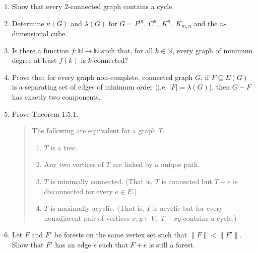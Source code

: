 \documentclass[12pt]{article}
\begin{document}
\begin{enumerate}
\item Show that every 2-connected graph contains a cycle.
\item Determine $\kappa(G)$ and $\lambda(G)$ for $G= P^m, \: C^n, \: K^n, \: K_{m,n}$ and the $n$-dimensional cube.
\item Is there a function $f: \mathbb{N} \to \mathbb{N}$ such that, for all $k \in \mathbb{N}$, every graph of minimum degree at least $f(k)$ is $k$-connected?
\item Prove that for every graph non-complete, connected graph $G$, if $F \subseteq E(G)$ is a separating set of edges of minimum order (i.e. $|F| = \lambda (G)$), then $G-F$ has exactly two components.
\item Prove Theorem 1.5.1.\\
\begin{quote}
The following are equivalent for a graph $T.$
\begin{enumerate}	
\item $T$ is a tree.
\item Any two vertices of $T$ are linked by a unique path.
\item $T$ is minimally connected. (That is, $T$ is connected but $T-e$ is disconnected for every $e \in E.$)
\item $T$ is maximally acyclic. (That is, $T$ is acyclic but for every nonadjacent pair of vertices $x,y \in V,$ $T+xy$ contains a cycle.)
\end{enumerate}
\end{quote}
\item Let $F$ and $F'$ be forests on the same vertex set such that $\parallel F \parallel < \parallel F' \parallel.$ Show that $F'$ has an edge $e$ such that $F+e$ is still a forest.
 \end{enumerate}
\end{document}
